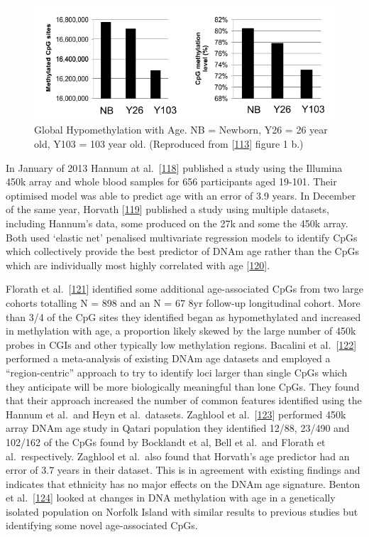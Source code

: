 \documentclass[
]{book}
\begin{document}
\begin{figure}

{\centering \includegraphics[width=0.8\linewidth]{figs/Heyn2012F1b} 

}

\caption{Global Hypomethylation with Age. NB = Newborn, Y26 = 26 year old, Y103 = 103 year old.
(Reproduced from {[}\protect\hyperlink{ref-Heyn2012}{113}{]} figure 1 b.)}\label{fig:Heyn2012F1b}
\end{figure}




In January of 2013 Hannum at al.~{[}\protect\hyperlink{ref-Hannum2013}{118}{]} published a study using the Illumina 450k array and whole blood samples for 656 participants aged 19-101.
Their optimised model was able to predict age with an error of 3.9 years.
In December of the same year, Horvath {[}\protect\hyperlink{ref-Horvath2013}{119}{]} published a study using multiple datasets, including Hannum's data, some produced on the 27k and some the 450k array.
Both used `elastic net' penalised multivariate regression models to identify CpGs which collectively provide the best predictor of DNAm age rather than the CpGs which are individually most highly correlated with age {[}\protect\hyperlink{ref-Friedman2010}{120}{]}.

Florath et al.~{[}\protect\hyperlink{ref-Florath2014}{121}{]} identified some additional age-associated CpGs from two large cohorts totalling N = 898 and an N = 67 8yr follow-up longitudinal cohort.
More than 3/4 of the CpG sites they identified began as hypomethylated and increased in methylation with age, a proportion likely skewed by the large number of 450k probes in CGIs and other typically low methylation regions.
Bacalini et al.~{[}\protect\hyperlink{ref-Bacalini2015}{122}{]} performed a meta-analysis of existing DNAm age datasets and employed a ``region-centric'' approach to try to identify loci larger than single CpGs which they anticipate will be more biologically meaningful than lone CpGs.
They found that their approach increased the number of common features identified using the Hannum et al.~and Heyn et al.~datasets.
Zaghlool et al.~{[}\protect\hyperlink{ref-Zaghlool2015}{123}{]} performed 450k array DNAm age study in Qatari population they identified 12/88, 23/490 and 102/162 of the CpGs found by Bocklandt et al, Bell et al.~and Florath et al.~respectively. Zaghlool et al.~also found that Horvath's age predictor had an error of 3.7 years in their dataset.
This is in agreement with existing findings and indicates that ethnicity has no major effects on the DNAm age signature. Benton et al.~{[}\protect\hyperlink{ref-Benton2017}{124}{]} looked at changes in DNA methylation with age in a genetically isolated population on Norfolk Island with similar results to previous studies but identifying some novel age-associated CpGs.
\end{document}
